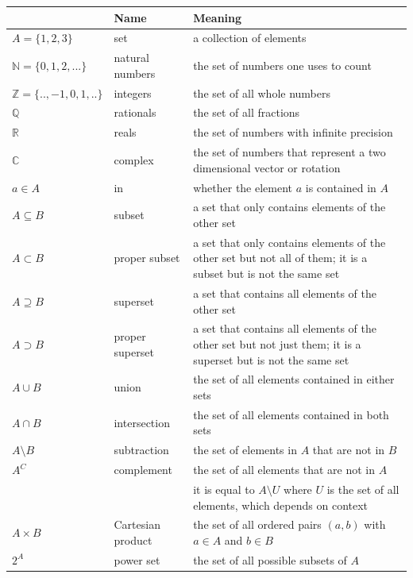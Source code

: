\documentclass[11pt,letterpaper,fleqn]{memoir} %
\begin{document}
\begin{tabular}{p{} p{} p{}}
	& Name & Meaning  \\ 
	\hline 
	$A = \{1,2,3\}$ & set & a collection of elements\\ 
	\hline 
	$\mathbb{N} = \{0, 1, 2, ...\}$ & natural numbers & the set of numbers one uses to count \\ 
	\hline 
	$\mathbb{Z} = \{.., -1, 0, 1, ..\}$ & integers & the set of all whole numbers \\ 
	\hline 
	$\mathbb{Q}$ & rationals & the set of all fractions \\ 
	\hline 
	$\mathbb{R}$ & reals & the set of numbers with infinite precision \\ 
	\hline 
	$\mathbb{C}$ & complex & the set of numbers that represent a two dimensional vector or rotation \\ 
	\hline 
	$a \in A$ & in & whether the element $a$ is contained in $A$ \\ 
	\hline 
	$A \subseteq B$ & subset & a set that only contains elements of the other set\\ 
	\hline 
	$A \subset B$ & proper subset & a set that only contains elements of the other set but not all of them; it is a subset but is not the same set\\ 
	\hline 
	$A \supseteq B$ & superset & a set that contains all elements of the other set\\ 
	\hline 
	$A \supset B$ & proper superset & a set that contains all elements of the other set but not just them; it is a superset but is not the same set\\ 
	\hline 
	$A \cup B$ & union & the set of all elements contained in either sets\\ 
	\hline 
	$A \cap B$ & intersection & the set of all elements contained in both sets \\ 
	\hline 
	$A \setminus B$ & subtraction & the set of elements in $A$ that are not in $B$  \\ 
	\hline 
	$A^C$& complement & the set of all elements that are not in $A$ \\ 
	& & it is equal to $A \setminus U$ where $U$ is the set of all elements, which depends on context \\ 
	\hline 
	$A \times B$ & Cartesian product & the set of all ordered pairs $(a, b)$ with $a \in A$ and $b \in B$  \\ 
	\hline 
	$2^A$ & power set & the set of all possible subsets of $A$  \\ 
	\hline 
\end{tabular} 
\end{document}
